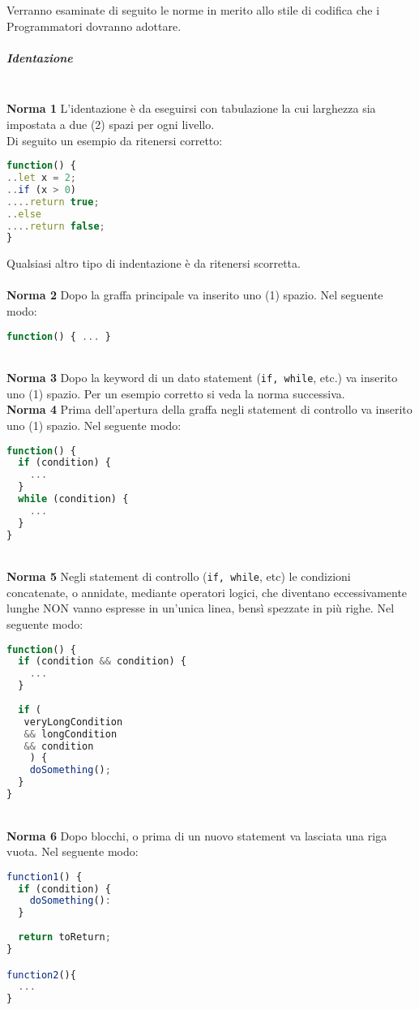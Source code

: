 Verranno esaminate di seguito le norme in merito allo stile di codifica che i Programmatori dovranno adottare.

\subparagraph{Identazione}\-\\
\textbf{Norma 1}
L'identazione è da eseguirsi con tabulazione la cui larghezza sia impostata a due (2) spazi per ogni livello.\\
Di seguito un esempio da ritenersi corretto:
\begin{lstlisting}[language=JavaScript]
function() {
..let x = 2;
..if (x > 0)
....return true;
..else
....return false;
}
\end{lstlisting}
Qualsiasi altro tipo di indentazione è da ritenersi scorretta.\\
\-\\
\textbf{Norma 2}
Dopo la graffa principale va inserito uno (1) spazio. Nel seguente modo:
\begin{lstlisting}[language=JavaScript]
function() { ... }
\end{lstlisting}
\-\\
\textbf{Norma 3}
Dopo la keyword di un dato statement (\texttt{if, while}, etc.) va inserito uno (1) spazio. Per un esempio corretto si veda la norma successiva.
\-\\
\textbf{Norma 4}
Prima dell'apertura della graffa negli statement di controllo va inserito uno (1) spazio. Nel seguente modo:
\begin{lstlisting}[language=JavaScript]
function() {
  if (condition) {
    ...  
  }
  while (condition) {
    ...
  }
}
\end{lstlisting}
\-\\
\textbf{Norma 5}
Negli statement di controllo (\texttt{if, while}, etc) le condizioni concatenate, o annidate, mediante operatori logici, che diventano eccessivamente lunghe NON vanno espresse in un'unica linea, bensì spezzate in più righe. Nel seguente modo:
\begin{lstlisting}[language=JavaScript]
function() {
  if (condition && condition) {
    ...  
  }
  
  if (
   veryLongCondition
   && longCondition
   && condition
    ) {
    doSomething();
  }
}
\end{lstlisting}
\-\\
\textbf{Norma 6}
Dopo blocchi, o prima di un nuovo statement va lasciata una riga vuota. Nel seguente modo:
\begin{lstlisting}[language=JavaScript]
function1() {
  if (condition) {
    doSomething():  
  }
  
  return toReturn;  
}

function2(){
  ...
}
\end{lstlisting}

